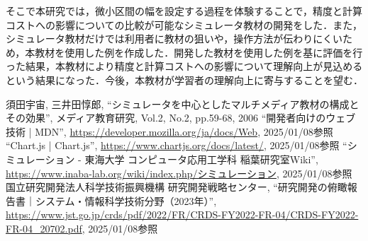 \documentclass[a4paper, 12pt]{ltjsarticle}
\begin{document}
そこで本研究では，微小区間の幅を設定する過程を体験することで，精度と計算コストへの影響についての比較が可能なシミュレータ教材の開発をした．また，シミュレータ教材だけでは利用者に教材の狙いや，操作方法が伝わりにくいため，本教材を使用した例を作成した．開発した教材を使用した例を基に評価を行った結果，本教材により精度と計算コストへの影響について理解向上が見込めるという結果になった．今後，本教材が学習者の理解向上に寄与することを望む．
\clearpage

\begin{thebibliography}{99}
 須田宇宙, 三井田惇郎, ``シミュレータを中心としたマルチメディア教材の構成とその効果'', メディア教育研究, Vol.2, No.2, pp.59-68, 2006
 ``開発者向けのウェブ技術 | MDN'', \url{https://developer.mozilla.org/ja/docs/Web}, 2025/01/08参照
 ``Chart.js | Chart.js'', \url{https://www.chartjs.org/docs/latest/}, 2025/01/08参照
 ``シミュレーション - 東海大学 コンピュータ応用工学科 稲葉研究室Wiki'', \url{https://www.inaba-lab.org/wiki/index.php/シミュレーション}, 2025/01/08参照
 国立研究開発法人科学技術振興機構 研究開発戦略センター, ``研究開発の俯瞰報告書｜システム・情報科学技術分野（2023年）'', \url{https://www.jst.go.jp/crds/pdf/2022/FR/CRDS-FY2022-FR-04/CRDS-FY2022-FR-04_20702.pdf}, 2025/01/08参照
\end{thebibliography}
\end{document}
